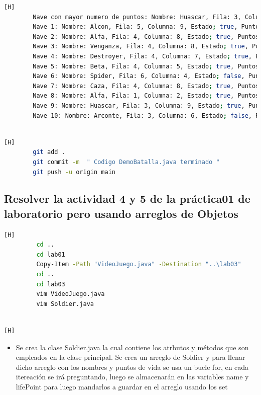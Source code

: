 \documentclass{article}
\begin{document}
\begin{lstlisting}[language=bash,caption={Compilando y ejecutando el programa con 10 elementos en el arreglo  }][H]
		Nave con mayor numero de puntos: Nombre: Huascar, Fila: 3, Columna: 9, Estado; true, Puntos: 91
		Nave 1: Nombre: Alcon, Fila: 5, Columna: 9, Estado; true, Puntos: 90
		Nave 2: Nombre: Alfa, Fila: 4, Columna: 8, Estado; true, Puntos: 65
		Nave 3: Nombre: Venganza, Fila: 4, Columna: 8, Estado; true, Puntos: 79
		Nave 4: Nombre: Destroyer, Fila: 4, Columna: 7, Estado; true, Puntos: 34
		Nave 5: Nombre: Beta, Fila: 4, Columna: 5, Estado; true, Puntos: 34
		Nave 6: Nombre: Spider, Fila: 6, Columna: 4, Estado; false, Puntos: 56
		Nave 7: Nombre: Caza, Fila: 4, Columna: 8, Estado; true, Puntos: 57
		Nave 8: Nombre: Alfa, Fila: 1, Columna: 2, Estado; true, Puntos: 23
		Nave 9: Nombre: Huascar, Fila: 3, Columna: 9, Estado; true, Puntos: 91
		Nave 10: Nombre: Arconte, Fila: 3, Columna: 6, Estado; false, Puntos: 68
		
	\end{lstlisting}
	
	
	\begin{lstlisting}[language=bash,caption={Commit: Codigo DemoBatalla.java terminado }][H]
		git add .
		git commit -m  " Codigo DemoBatalla.java terminado "			
		git push -u origin main
	\end{lstlisting}
	
	
	
	
		\subsection{Resolver la actividad 4 y 5 de la práctica01 de laboratorio pero usando arreglos de Objetos}
	
	\begin{lstlisting}[language=bash,caption={Se está copiando el archivo VideoJuego.java para resolver la actividad 4 y 5. Tambiénse está creando la clase Soldier para poder los objetos }][H]
		 cd ..
		 cd lab01
		 Copy-Item -Path "VideoJuego.java" -Destination "..\lab03"	
		 cd ..
		 cd lab03
		 vim VideoJuego.java
		 vim Soldier.java
		
	\end{lstlisting}
	
	\begin{lstlisting}[language=bash,caption={Se resuelve el ejercicio 4 de la praactica de laboratorio 01 usando arreglo con objetos.  }][H]	
	\end{lstlisting}
	
	\begin{itemize}	
		\item  Se crea la clase Soldier.java la cual contiene los atrbutos y métodos que son empleados en la clase principal. Se crea un arreglo de Soldier y para llenar dicho arreglo con los nombres y puntos de vida se usa un bucle for, en cada itereación se irá preguntando, luego se almacenarán en las variables name y lifePoint para luego mandarlos a guardar en el arreglo usando los set
	\end{itemize}
	
\end{document}

